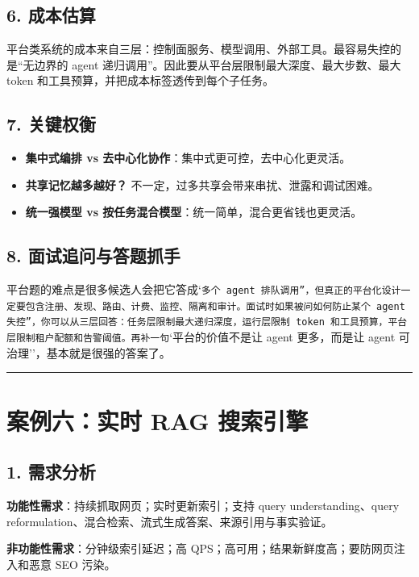 \subsection{6. 成本估算}
平台类系统的成本来自三层：控制面服务、模型调用、外部工具。最容易失控的是``无边界的 agent 递归调用''。因此要从平台层限制最大深度、最大步数、最大 token 和工具预算，并把成本标签透传到每个子任务。


\subsection{7. 关键权衡}
\begin{itemize}[leftmargin=2em]
\item \textbf{集中式编排 vs 去中心化协作}：集中式更可控，去中心化更灵活。
\item \textbf{共享记忆越多越好？} 不一定，过多共享会带来串扰、泄露和调试困难。
\item \textbf{统一强模型 vs 按任务混合模型}：统一简单，混合更省钱也更灵活。
\end{itemize}

\subsection{8. 面试追问与答题抓手}
平台题的难点是很多候选人会把它答成`\texttt{多个 agent 排队调用''，但真正的平台化设计一定要包含注册、发现、路由、计费、监控、隔离和审计。面试时如果被问}\texttt{如何防止某个 agent 失控''，你可以从三层回答：任务层限制最大递归深度，运行层限制 token 和工具预算，平台层限制租户配额和告警阈值。再补一句}`平台的价值不是让 agent 更多，而是让 agent 可治理''，基本就是很强的答案了。


\bigskip\hrule\bigskip

\section{案例六：实时 RAG 搜索引擎}

\subsection{1. 需求分析}
\textbf{功能性需求}：持续抓取网页；实时更新索引；支持 query understanding、query reformulation、混合检索、流式生成答案、来源引用与事实验证。


\textbf{非功能性需求}：分钟级索引延迟；高 QPS；高可用；结果新鲜度高；要防网页注入和恶意 SEO 污染。


